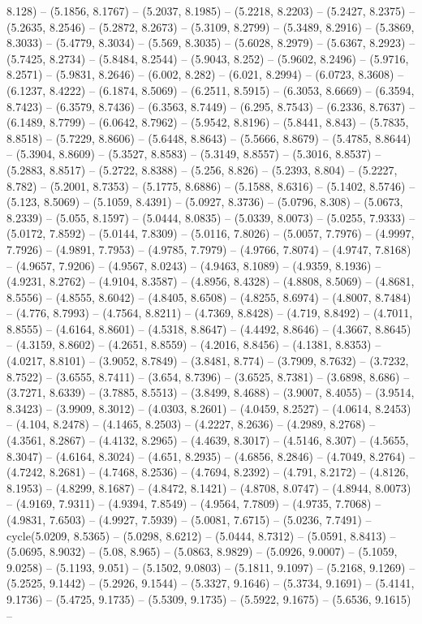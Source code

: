 8.128) -- (5.1856, 8.1767) -- (5.2037, 8.1985) -- (5.2218, 8.2203) -- (5.2427, 8.2375) -- (5.2635, 8.2546) -- (5.2872, 8.2673) -- (5.3109, 8.2799) -- (5.3489, 8.2916) -- (5.3869, 8.3033) -- (5.4779, 8.3034) -- (5.569, 8.3035) -- (5.6028, 8.2979) -- (5.6367, 8.2923) -- (5.7425, 8.2734) -- (5.8484, 8.2544) -- (5.9043, 8.252) -- (5.9602, 8.2496) -- (5.9716, 8.2571) -- (5.9831, 8.2646) -- (6.002, 8.282) -- (6.021, 8.2994) -- (6.0723, 8.3608) -- (6.1237, 8.4222) -- (6.1874, 8.5069) -- (6.2511, 8.5915) -- (6.3053, 8.6669) -- (6.3594, 8.7423) -- (6.3579, 8.7436) -- (6.3563, 8.7449) -- (6.295, 8.7543) -- (6.2336, 8.7637) -- (6.1489, 8.7799) -- (6.0642, 8.7962) -- (5.9542, 8.8196) -- (5.8441, 8.843) -- (5.7835, 8.8518) -- (5.7229, 8.8606) -- (5.6448, 8.8643) -- (5.5666, 8.8679) -- (5.4785, 8.8644) -- (5.3904, 8.8609) -- (5.3527, 8.8583) -- (5.3149, 8.8557) -- (5.3016, 8.8537) -- (5.2883, 8.8517) -- (5.2722, 8.8388) -- (5.256, 8.826) -- (5.2393, 8.804) -- (5.2227, 8.782) -- (5.2001, 8.7353) -- (5.1775, 8.6886) -- (5.1588, 8.6316) -- (5.1402, 8.5746) -- (5.123, 8.5069) -- (5.1059, 8.4391) -- (5.0927, 8.3736) -- (5.0796, 8.308) -- (5.0673, 8.2339) -- (5.055, 8.1597) -- (5.0444, 8.0835) -- (5.0339, 8.0073) -- (5.0255, 7.9333) -- (5.0172, 7.8592) -- (5.0144, 7.8309) -- (5.0116, 7.8026) -- (5.0057, 7.7976) -- (4.9997, 7.7926) -- (4.9891, 7.7953) -- (4.9785, 7.7979) -- (4.9766, 7.8074) -- (4.9747, 7.8168) -- (4.9657, 7.9206) -- (4.9567, 8.0243) -- (4.9463, 8.1089) -- (4.9359, 8.1936) -- (4.9231, 8.2762) -- (4.9104, 8.3587) -- (4.8956, 8.4328) -- (4.8808, 8.5069) -- (4.8681, 8.5556) -- (4.8555, 8.6042) -- (4.8405, 8.6508) -- (4.8255, 8.6974) -- (4.8007, 8.7484) -- (4.776, 8.7993) -- (4.7564, 8.8211) -- (4.7369, 8.8428) -- (4.719, 8.8492) -- (4.7011, 8.8555) -- (4.6164, 8.8601) -- (4.5318, 8.8647) -- (4.4492, 8.8646) -- (4.3667, 8.8645) -- (4.3159, 8.8602) -- (4.2651, 8.8559) -- (4.2016, 8.8456) -- (4.1381, 8.8353) -- (4.0217, 8.8101) -- (3.9052, 8.7849) -- (3.8481, 8.774) -- (3.7909, 8.7632) -- (3.7232, 8.7522) -- (3.6555, 8.7411) -- (3.654, 8.7396) -- (3.6525, 8.7381) -- (3.6898, 8.686) -- (3.7271, 8.6339) -- (3.7885, 8.5513) -- (3.8499, 8.4688) -- (3.9007, 8.4055) -- (3.9514, 8.3423) -- (3.9909, 8.3012) -- (4.0303, 8.2601) -- (4.0459, 8.2527) -- (4.0614, 8.2453) -- (4.104, 8.2478) -- (4.1465, 8.2503) -- (4.2227, 8.2636) -- (4.2989, 8.2768) -- (4.3561, 8.2867) -- (4.4132, 8.2965) -- (4.4639, 8.3017) -- (4.5146, 8.307) -- (4.5655, 8.3047) -- (4.6164, 8.3024) -- (4.651, 8.2935) -- (4.6856, 8.2846) -- (4.7049, 8.2764) -- (4.7242, 8.2681) -- (4.7468, 8.2536) -- (4.7694, 8.2392) -- (4.791, 8.2172) -- (4.8126, 8.1953) -- (4.8299, 8.1687) -- (4.8472, 8.1421) -- (4.8708, 8.0747) -- (4.8944, 8.0073) -- (4.9169, 7.9311) -- (4.9394, 7.8549) -- (4.9564, 7.7809) -- (4.9735, 7.7068) -- (4.9831, 7.6503) -- (4.9927, 7.5939) -- (5.0081, 7.6715) -- (5.0236, 7.7491) -- cycle(5.0209, 8.5365) -- (5.0298, 8.6212) -- (5.0444, 8.7312) -- (5.0591, 8.8413) -- (5.0695, 8.9032) -- (5.08, 8.965) -- (5.0863, 8.9829) -- (5.0926, 9.0007) -- (5.1059, 9.0258) -- (5.1193, 9.051) -- (5.1502, 9.0803) -- (5.1811, 9.1097) -- (5.2168, 9.1269) -- (5.2525, 9.1442) -- (5.2926, 9.1544) -- (5.3327, 9.1646) -- (5.3734, 9.1691) -- (5.4141, 9.1736) -- (5.4725, 9.1735) -- (5.5309, 9.1735) -- (5.5922, 9.1675) -- (5.6536, 9.1615) -- 
